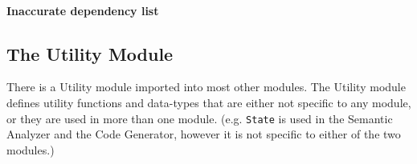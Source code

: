 \documentclass[12pt]{article}
\begin{document}
\paragraph{Inaccurate dependency list}

\subsection{The Utility Module}

There is a Utility module imported into most other modules. The Utility module
defines utility functions and data-types that are either not specific to any module, or they
are used in more than one module. (e.g. \verb$State$ is used in the Semantic
Analyzer and the Code Generator, however it is not specific to either of the two
modules.)



\end{document}
